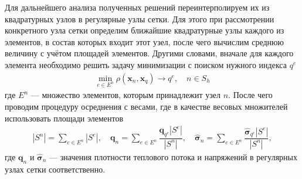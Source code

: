 Для дальнейшего анализа полученных решений переинтерполируем их из квадратурных узлов в регулярные узлы сетки. Для этого при рассмотрении конкретного узла сетки определим ближайшие квадратурные узлы каждого из элементов, в состав которых входит этот узел, после чего вычислим среднюю величину с учётом площадей элементов. Другими словами, вначале для каждого элемента необходимо решить задачу минимизации с поиском нужного индекса $q^e$
\begin{gather*}
	\min_{e \in E^n} \rho(\boldsymbol{x}_n, \boldsymbol{x}_q) \rightarrow q^e,
	\quad
	n \in S_h
\end{gather*}
где $E^n$ --- множество элементов, которым принадлежит узел $n$. После чего проводим процедуру осреднения с весами, где в качестве весовых множителей использовать площади элементов
\begin{gather*}
	|S^n| = \sum\limits_{e \in E^n} |S^e|,
	\quad
	\boldsymbol{q}_n = \sum\limits_{e \in E^n} \dfrac{\boldsymbol{q}_{q^e} |S^e|}{|S^n|},
	\quad
	\widehat{\boldsymbol{\sigma}}_n = \sum\limits_{e \in E^n} \dfrac{\widehat{\boldsymbol{\sigma}}_{q^e} |S^e|}{|S^n|},
\end{gather*}
где $\boldsymbol{q}_n$ и $\widehat{\boldsymbol{\sigma}}_n$ --- значения плотности теплового потока и напряжений в регулярных узлах сетки соответственно.